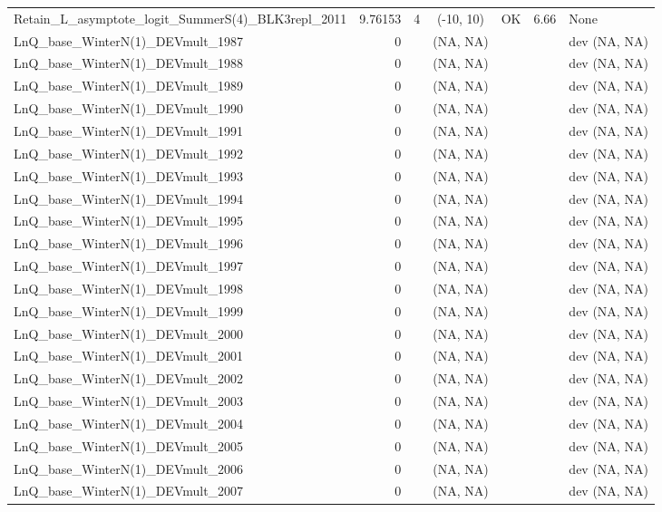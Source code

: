 \documentclass[12pt,]{article}
\begin{document}
\begin{landscape}
\begin{longtable}{lrcccll}
  Retain\_L\_asymptote\_logit\_SummerS(4)\_BLK3repl\_2011 & 9.76153 & 4 & (-10, 10) & OK & 6.66 & None \\ 
  LnQ\_base\_WinterN(1)\_DEVmult\_1987 & 0 &  & (NA, NA) &  &  & dev (NA, NA) \\ 
  LnQ\_base\_WinterN(1)\_DEVmult\_1988 & 0 &  & (NA, NA) &  &  & dev (NA, NA) \\ 
  LnQ\_base\_WinterN(1)\_DEVmult\_1989 & 0 &  & (NA, NA) &  &  & dev (NA, NA) \\ 
  LnQ\_base\_WinterN(1)\_DEVmult\_1990 & 0 &  & (NA, NA) &  &  & dev (NA, NA) \\ 
  LnQ\_base\_WinterN(1)\_DEVmult\_1991 & 0 &  & (NA, NA) &  &  & dev (NA, NA) \\ 
  LnQ\_base\_WinterN(1)\_DEVmult\_1992 & 0 &  & (NA, NA) &  &  & dev (NA, NA) \\ 
  LnQ\_base\_WinterN(1)\_DEVmult\_1993 & 0 &  & (NA, NA) &  &  & dev (NA, NA) \\ 
  LnQ\_base\_WinterN(1)\_DEVmult\_1994 & 0 &  & (NA, NA) &  &  & dev (NA, NA) \\ 
  LnQ\_base\_WinterN(1)\_DEVmult\_1995 & 0 &  & (NA, NA) &  &  & dev (NA, NA) \\ 
  LnQ\_base\_WinterN(1)\_DEVmult\_1996 & 0 &  & (NA, NA) &  &  & dev (NA, NA) \\ 
  LnQ\_base\_WinterN(1)\_DEVmult\_1997 & 0 &  & (NA, NA) &  &  & dev (NA, NA) \\ 
  LnQ\_base\_WinterN(1)\_DEVmult\_1998 & 0 &  & (NA, NA) &  &  & dev (NA, NA) \\ 
  LnQ\_base\_WinterN(1)\_DEVmult\_1999 & 0 &  & (NA, NA) &  &  & dev (NA, NA) \\ 
  LnQ\_base\_WinterN(1)\_DEVmult\_2000 & 0 &  & (NA, NA) &  &  & dev (NA, NA) \\ 
  LnQ\_base\_WinterN(1)\_DEVmult\_2001 & 0 &  & (NA, NA) &  &  & dev (NA, NA) \\ 
  LnQ\_base\_WinterN(1)\_DEVmult\_2002 & 0 &  & (NA, NA) &  &  & dev (NA, NA) \\ 
  LnQ\_base\_WinterN(1)\_DEVmult\_2003 & 0 &  & (NA, NA) &  &  & dev (NA, NA) \\ 
  LnQ\_base\_WinterN(1)\_DEVmult\_2004 & 0 &  & (NA, NA) &  &  & dev (NA, NA) \\ 
  LnQ\_base\_WinterN(1)\_DEVmult\_2005 & 0 &  & (NA, NA) &  &  & dev (NA, NA) \\ 
  LnQ\_base\_WinterN(1)\_DEVmult\_2006 & 0 &  & (NA, NA) &  &  & dev (NA, NA) \\ 
  LnQ\_base\_WinterN(1)\_DEVmult\_2007 & 0 &  & (NA, NA) &  &  & dev (NA, NA) \\ 

\end{longtable}
\end{landscape}
\end{document}
